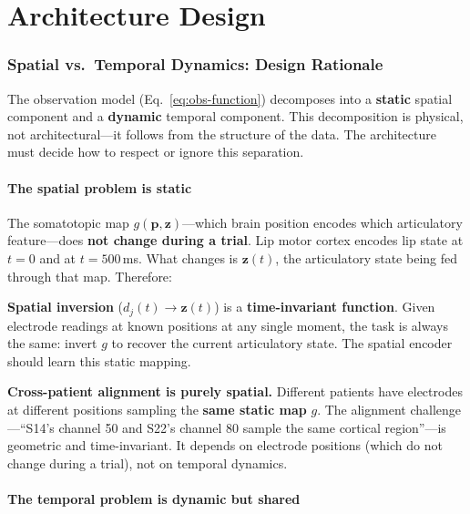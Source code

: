\documentclass[11pt,letterpaper]{article}
\newcommand{\bfp}{\mathbf{p}}
\newcommand{\bfz}{\mathbf{z}}
\begin{document}

\part{Architecture Design}

\section{Spatial vs.\ Temporal Dynamics: Design Rationale}\label{sec:spatial-temporal}

The observation model (Eq.~\ref{eq:obs-function}) decomposes into a \textbf{static} spatial component and a \textbf{dynamic} temporal component. This decomposition is physical, not architectural---it follows from the structure of the data. The architecture must decide how to respect or ignore this separation.

\subsection{The spatial problem is static}

The somatotopic map $g(\bfp, \bfz)$---which brain position encodes which articulatory feature---does \textbf{not change during a trial}. Lip motor cortex encodes lip state at $t{=}0$ and at $t{=}500$\,ms. What changes is $\bfz(t)$, the articulatory state being fed through that map. Therefore:

\textbf{Spatial inversion} ($d_j(t) \to \bfz(t)$) is a \textbf{time-invariant function}. Given electrode readings at known positions at any single moment, the task is always the same: invert $g$ to recover the current articulatory state. The spatial encoder should learn this static mapping.

\textbf{Cross-patient alignment is purely spatial.} Different patients have electrodes at different positions sampling the \textbf{same static map} $g$. The alignment challenge---``S14's channel 50 and S22's channel 80 sample the same cortical region''---is geometric and time-invariant. It depends on electrode positions (which do not change during a trial), not on temporal dynamics.

\subsection{The temporal problem is dynamic but shared}
\end{document}
